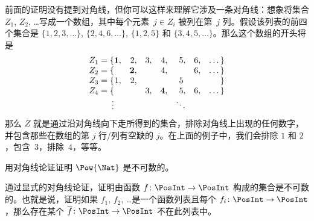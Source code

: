 \documentclass[../../../include/open-logic-section]{subfiles}
\begin{document}
\begin{explain}
前面的证明没有提到对角线，但你可以这样来理解它涉及一条对角线：想象将集合 $Z_1$, $Z_2$, \dots 写成一个数组，其中每个元素~$j \in Z_i$ 被列在第~$j$ 列。假设该列表的前四个集合是 $\{1,2,3,\dots\}$, $\{2, 4, 6, \dots\}$, $\{1,2,5\}$ 和 $\{3,4,5,\dots\}$。那么这个数组的开头将是
\[
\begin{array}{r@{}rrrrrrr}
  Z_1 = \{ & \mathbf{1}, & 2, & 3, & 4, & 5, & 6, & \dots\}\\
  Z_2 = \{ &  & \mathbf{2}, &  & 4, &  & 6, & \dots\}\\
  Z_3 = \{ & 1, & 2, &  &  & 5\phantom{,} &  & \}\\
  Z_4 = \{ &  &  & 3, & \mathbf{4}, & 5, & 6, & \dots\}\\
  \vdots & & & & & \ddots
\end{array}
\]
那么 $\overline{Z}$ 就是通过沿对角线向下走所得到的集合，排除对角线上出现的任何数字，并包含那些在数组的第 $j$ 行/列有空缺的 $j$。在上面的例子中，我们会排除 $1$ 和 $2$，包含~$3$，排除~$4$，等等。
\end{explain}

\begin{prob}
用对角线论证证明 $\Pow{\Nat}$ 是不可数的。
\end{prob}

\begin{prob}\label{sfr:siz:nen:prob:f-posint}
通过显式的对角线论证，证明由函数 $f \colon \PosInt \to \PosInt$ 构成的集合是不可数的。也就是说，证明如果 $f_1$, $f_2$, \dots 是一个函数列表且每个 $f_i\colon \PosInt \to \PosInt$，那么存在某个 $\overline{f}\colon \PosInt \to \PosInt$ 不在此列表中。
\end{prob}
\end{document}
